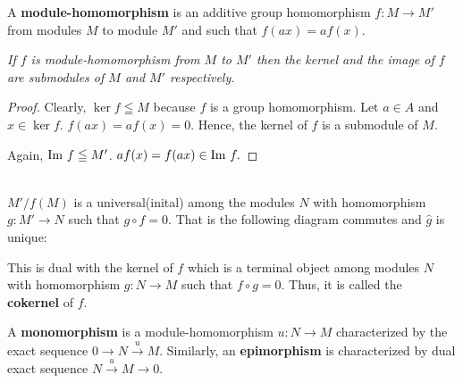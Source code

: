     \begin{definition}
        A \textbf{module-homomorphism} is an additive group homomorphism $f: M \to M'$ from modules $M$ to module $M'$ and such that $f(ax) = af(x).$  
    \end{definition}

    \noindent \textit{If $f$ is module-homomorphism from $M$ to $M'$ then the kernel and the image of $f$ are submodules of $M$ and $M'$ respectively.}
    \begin{proof}
        Clearly, $\ker f \leqq M$ because $f$ is a group homomorphism. Let $a \in A$ and $x \in \ker f$. $f(ax) = af(x) = 0$. Hence, the kernel of $f$ is a submodule of $M$.

        Again, $\mathrm{Im}\  f \leqq M'$. $af(x) = f(ax) \in \mathrm{Im}\  f.$

     
    \end{proof}

    \horline\\
    $M'/f(M)$ is a universal(inital) among the modules $N$ with homomorphism $g:M' \to N$ such that $g\circ f = 0.$ That is the following diagram commutes and $\hat g$ is unique:
    \\
    \begin{center}
        
    \end{center}

    This is dual with the kernel of $f$ which is a terminal object among modules $N$ with homomorphism $g: N \to M$ such that $f \circ g = 0.$ Thus, it is called the \textbf{cokernel} of $f$.    
    \horline

    
    \begin{definition}
        A \textbf{monomorphism} is a module-homomorphism $u: N \to M$ characterized by the exact sequence $0 \to N \overset{u}{\to} M.$ Similarly, an \textbf{epimorphism} is characterized by dual exact sequence $N \overset{u}{\to} M \to 0.$ 
    \end{definition}

